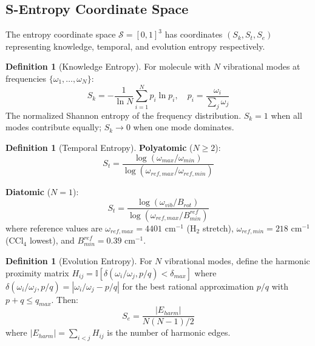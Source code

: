 \documentclass[11pt,a4paper]{article}
\theoremstyle{definition}
\newtheorem{definition}[theorem]{Definition}
\theoremstyle{remark}
\begin{document}
\subsection{S-Entropy Coordinate Space}

The entropy coordinate space $\mathcal{S} = [0,1]^3$ has coordinates $(S_k, S_t, S_e)$ representing knowledge, temporal, and evolution entropy respectively.

\begin{definition}[Knowledge Entropy]
\label{def:knowledge_entropy}
For molecule with $N$ vibrational modes at frequencies $\{\omega_1, \ldots, \omega_N\}$:
\begin{equation}
S_k = -\frac{1}{\ln N} \sum_{i=1}^N p_i \ln p_i, \quad p_i = \frac{\omega_i}{\sum_j \omega_j}
\end{equation}
The normalized Shannon entropy of the frequency distribution. $S_k = 1$ when all modes contribute equally; $S_k \to 0$ when one mode dominates.
\end{definition}

\begin{definition}[Temporal Entropy]
\label{def:temporal_entropy}
\textbf{Polyatomic} ($N \geq 2$):
\begin{equation}
S_t = \frac{\log(\omega_{max}/\omega_{min})}{\log(\omega_{ref,max}/\omega_{ref,min})}
\end{equation}

\textbf{Diatomic} ($N = 1$):
\begin{equation}
S_t = \frac{\log(\omega_{vib}/B_{rot})}{\log(\omega_{ref,max}/B^{ref}_{min})}
\end{equation}
where reference values are $\omega_{ref,max} = 4401$ cm$^{-1}$ (H$_2$ stretch), $\omega_{ref,min} = 218$ cm$^{-1}$ (CCl$_4$ lowest), and $B^{ref}_{min} = 0.39$ cm$^{-1}$.
\end{definition}

\begin{definition}[Evolution Entropy]
\label{def:evolution_entropy}
For $N$ vibrational modes, define the harmonic proximity matrix $H_{ij} = \mathbb{I}[\delta(\omega_i/\omega_j, p/q) < \delta_{max}]$ where $\delta(\omega_i/\omega_j, p/q) = |\omega_i/\omega_j - p/q|$ for the best rational approximation $p/q$ with $p + q \leq q_{max}$. Then:
\begin{equation}
S_e = \frac{|E_{harm}|}{N(N-1)/2}
\end{equation}
where $|E_{harm}| = \sum_{i<j} H_{ij}$ is the number of harmonic edges.
\end{definition}
\end{document}
